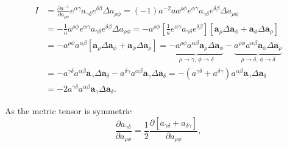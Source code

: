\begin{equation}\label{eq:del_a_ab_3}
    \begin{split}
        I &= \frac{\partial a^{-1}}{\partial a_{\rho \phi}} e^{\alpha \gamma} a_{\gamma \delta} e^{\delta \beta} \Delta a_{\rho \phi} = \left( -1 \right) a^{-2} a a^{\rho \phi} e^{\alpha \gamma} a_{\gamma \delta} e^{\delta \beta} \Delta a_{\rho \phi} \\ &= - \frac{1}{a} a^{\rho \phi} e^{\alpha \gamma} a_{\gamma \delta} e^{\delta \beta} \Delta a_{\rho \phi} = - a^{\rho \phi} \left[ \frac{1}{a} e^{\alpha \gamma} a_{\gamma \delta} e^{\delta \beta} \right] \left[ \boldsymbol{a}_{\rho} \Delta \boldsymbol{a}_{\phi} + \boldsymbol{a}_{\phi} \Delta \boldsymbol{a}_{\rho} \right] \\ &= - a^{\rho \phi} a^{\alpha \beta} \left[ \boldsymbol{a}_{\rho} \Delta \boldsymbol{a}_{\phi} + \boldsymbol{a}_{\phi} \Delta \boldsymbol{a}_{\rho} \right] = \underbrace{- a^{\rho \phi} a^{\alpha \beta} \boldsymbol{a}_{\rho} \Delta \boldsymbol{a}_{\phi}}_{\rho \rightarrow \gamma, \, \phi \rightarrow \delta} - \underbrace{a^{\rho \phi} a^{\alpha \beta} \boldsymbol{a}_{\phi} \Delta \boldsymbol{a}_{\rho}}_{\rho \rightarrow \delta, \, \phi \rightarrow \delta} \\ &= - a^{\gamma \delta} a^{\alpha \beta} \boldsymbol{a}_{\gamma} \Delta \boldsymbol{a}_{\delta} - a^{\delta \gamma} a^{\alpha \beta} \boldsymbol{a}_{\gamma} \Delta \boldsymbol{a}_{\delta} = - \left( a^{\gamma \delta} + a^{\delta \gamma} \right) a^{\alpha \beta} \boldsymbol{a}_{\gamma} \Delta \boldsymbol{a}_{\delta} \\ &= - 2 a^{\gamma \delta} a^{\alpha \beta} \boldsymbol{a}_{\gamma} \Delta \boldsymbol{a}_{\delta}.
\end{split}
\end{equation}

As the metric tensor is symmetric
\begin{equation}\label{eq:daabaab}
\frac{\partial a_{\gamma \delta}}{\partial a_{\rho \phi}} = \frac{1}{2} \frac{\partial \left[ a_{\gamma \delta}+ a_{\delta \gamma} \right]}{\partial a_{\rho \phi}},
\end{equation}

